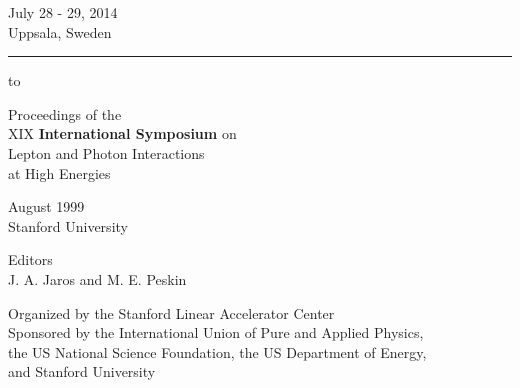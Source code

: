 \documentclass[10pt]{book}
\title{}
\date{}
\newcommand{\HRule}[1]{\hfill \rule{0.3\linewidth}{#1}} %
\begin{document}
\thispagestyle{empty}


{\centering \large \sffamily
\hfill July 28 - 29, 2014 \\
\hfill Uppsala, Sweden \\

\HRule{1pt}} %



\hbox to\hsize{\null}


\vfill
\begin{center}

\begin{LARGE}

{\sffamily
Proceedings of the \\[1ex]
XIX \textbf{International Symposium} on  \\[1ex]
Lepton and Photon Interactions\\[2ex]
at High Energies}

\end{LARGE}

\vfill



\vfill\vfill

\begin{Large}
August 1999\\[2ex]
Stanford University\\


\vfill\vfill \vfill


Editors\\
  J. A. Jaros and M. E. Peskin\\
\end{Large}
\vfill\vfill

 Organized by the Stanford Linear Accelerator Center \\[2ex]

Sponsored by the International Union of Pure and Applied Physics, \\
the US National Science Foundation,   
the US Department of Energy,\\
 and Stanford University


\end{center}

\end{document}
